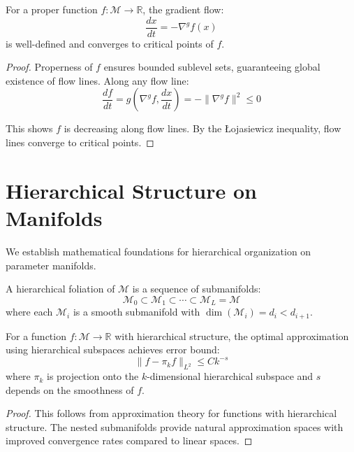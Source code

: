 \begin{theorem}
\label{thm:gradient_flow_stability}
For a proper function $f: \mathcal{M} \to \mathbb{R}$, the gradient flow:
$$\frac{dx}{dt} = -\nabla^g f(x)$$
is well-defined and converges to critical points of $f$.
\end{theorem}

\begin{proof}
Properness of $f$ ensures bounded sublevel sets, guaranteeing global existence of flow lines. Along any flow line:
$$\frac{df}{dt} = g(\nabla^g f, \frac{dx}{dt}) = -\|\nabla^g f\|^2 \leq 0$$

This shows $f$ is decreasing along flow lines. By the Łojasiewicz inequality, flow lines converge to critical points.
\end{proof}

\section{Hierarchical Structure on Manifolds}

We establish mathematical foundations for hierarchical organization on parameter manifolds.

\begin{definition}
\label{def:hierarchical_foliation}
A hierarchical foliation of $\mathcal{M}$ is a sequence of submanifolds:
$$\mathcal{M}_0 \subset \mathcal{M}_1 \subset \cdots \subset \mathcal{M}_L = \mathcal{M}$$
where each $\mathcal{M}_i$ is a smooth submanifold with $\dim(\mathcal{M}_i) = d_i < d_{i+1}$.
\end{definition}

\begin{theorem}
\label{thm:hierarchical_optimality}
For a function $f: \mathcal{M} \to \mathbb{R}$ with hierarchical structure, the optimal approximation using hierarchical subspaces achieves error bound:
$$\|f - \pi_k f\|_{L^2} \leq C k^{-s}$$
where $\pi_k$ is projection onto the $k$-dimensional hierarchical subspace and $s$ depends on the smoothness of $f$.
\end{theorem}

\begin{proof}
This follows from approximation theory for functions with hierarchical structure. The nested submanifolds provide natural approximation spaces with improved convergence rates compared to linear spaces.
\end{proof}

